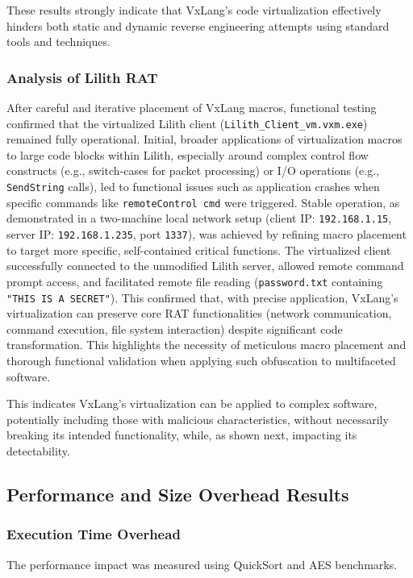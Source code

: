 These results strongly indicate that VxLang's code virtualization effectively hinders both static and dynamic reverse engineering attempts using standard tools and techniques.

\subsubsection{Analysis of Lilith RAT}

After careful and iterative placement of VxLang macros, functional testing confirmed that the virtualized Lilith client (\texttt{Lilith\_Client\_vm.vxm.exe}) remained fully operational. Initial, broader applications of virtualization macros to large code blocks within Lilith, especially around complex control flow constructs (e.g., switch-cases for packet processing) or I/O operations (e.g., \texttt{SendString} calls), led to functional issues such as application crashes when specific commands like \texttt{remoteControl cmd} were triggered. Stable operation, as demonstrated in a two-machine local network setup (client IP: \texttt{192.168.1.15}, server IP: \texttt{192.168.1.235}, port \texttt{1337}), was achieved by refining macro placement to target more specific, self-contained critical functions. The virtualized client successfully connected to the unmodified Lilith server, allowed remote command prompt access, and facilitated remote file reading (\texttt{password.txt} containing \texttt{"THIS IS A SECRET"}). This confirmed that, with precise application, VxLang's virtualization can preserve core RAT functionalities (network communication, command execution, file system interaction) despite significant code transformation. This highlights the necessity of meticulous macro placement and thorough functional validation when applying such obfuscation to multifaceted software.

This indicates VxLang's virtualization can be applied to complex software, potentially including those with malicious characteristics, without necessarily breaking its intended functionality, while, as shown next, impacting its detectability.

\subsection{Performance and Size Overhead Results}

\subsubsection{Execution Time Overhead}
The performance impact was measured using QuickSort and AES benchmarks.

